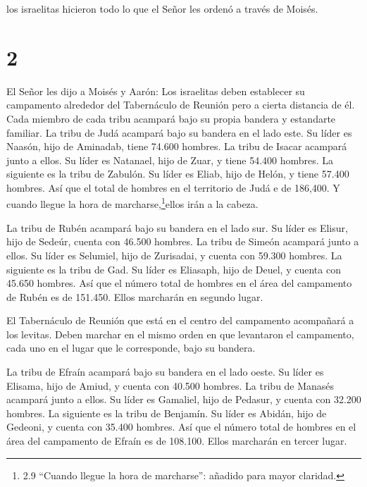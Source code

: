  los israelitas hicieron todo lo que el Señor les ordenó a
través de Moisés.

\hypertarget{section-1}{%
\section{2}\label{section-1}}

 El Señor les dijo a Moisés y Aarón:  Los
israelitas deben establecer su campamento alrededor del Tabernáculo de
Reunión pero a cierta distancia de él. Cada miembro de cada tribu
acampará bajo su propia bandera y estandarte familiar.  La
tribu de Judá acampará bajo su bandera en el lado este. Su líder es
Naasón, hijo de Aminadab,  tiene 74.600 hombres.
 La tribu de Isacar acampará junto a ellos. Su líder es
Natanael, hijo de Zuar,  y tiene 54.400 hombres.
 La siguiente es la tribu de Zabulón. Su líder es Eliab,
hijo de Helón,  y tiene 57.400 hombres.  Así que
el total de hombres en el territorio de Judá e de 186,400. Y cuando
llegue la hora de marcharse,\footnote{2.9 ``Cuando llegue la hora de
  marcharse'': añadido para mayor claridad.}ellos irán a la cabeza.

 La tribu de Rubén acampará bajo su bandera en el lado sur.
Su líder es Elisur, hijo de Sedeúr,  cuenta con 46.500
hombres.  La tribu de Simeón acampará junto a ellos. Su
líder es Selumiel, hijo de Zurisadai,  y cuenta con 59.300
hombres.  La siguiente es la tribu de Gad. Su líder es
Eliasaph, hijo de Deuel,  y cuenta con 45.650 hombres.
 Así que el número total de hombres en el área del
campamento de Rubén es de 151.450. Ellos marcharán en segundo lugar.

 El Tabernáculo de Reunión que está en el centro del
campamento acompañará a los levitas. Deben marchar en el mismo orden en
que levantaron el campamento, cada uno en el lugar que le corresponde,
bajo su bandera.

 La tribu de Efraín acampará bajo su bandera en el lado
oeste. Su líder es Elisama, hijo de Amiud,  y cuenta con
40.500 hombres.  La tribu de Manasés acampará junto a
ellos. Su líder es Gamaliel, hijo de Pedasur,  y cuenta con
32.200 hombres.  La siguiente es la tribu de Benjamín. Su
líder es Abidán, hijo de Gedeoni,  y cuenta con 35.400
hombres.  Así que el número total de hombres en el área del
campamento de Efraín es de 108.100. Ellos marcharán en tercer lugar.

